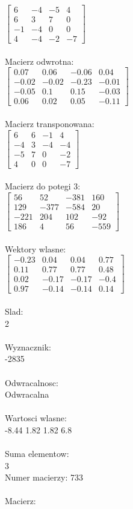 \documentclass[a4paper,12pt]{article}
\begin{document}
$\begin{bmatrix} 6&-4&-5&4\\6&3&7&0\\-1&-4&0&0\\4&-4&-2&-7 \end{bmatrix}$
\\
\\
Macierz odwrotna:\\

$\begin{bmatrix} 0.07&0.06&-0.06&0.04\\-0.02&-0.02&-0.23&-0.01\\-0.05&0.1&0.15&-0.03\\0.06&0.02&0.05&-0.11 \end{bmatrix}$
\\
\\
Macierz transponowana:\\

$\begin{bmatrix} 6&6&-1&4\\-4&3&-4&-4\\-5&7&0&-2\\4&0&0&-7 \end{bmatrix}$
\\
\\
Macierz do potegi 3:\\

$\begin{bmatrix} 56&52&-381&160\\129&-377&-584&20\\-221&204&102&-92\\186&4&56&-559 \end{bmatrix}$
\\
\\
Wektory wlasne:\\

$\begin{bmatrix} -0.23&0.04&0.04&0.77\\0.11&0.77&0.77&0.48\\0.02&-0.17&-0.17&-0.4\\0.97&-0.14&-0.14&0.14 \end{bmatrix}$
\\
\\
Slad:\\
2
\\
\\
Wyznacznik:\\
-2835
\\
\\
Odwracalnosc:\\
Odwracalna
\\
\\
Wartosci wlasne:\\
-8.44 1.82 1.82 6.8
\\
\\
Suma elementow:\\
3
\\
\newpage
Numer macierzy:
733
\\
\\
Macierz:\\
\end{document}
